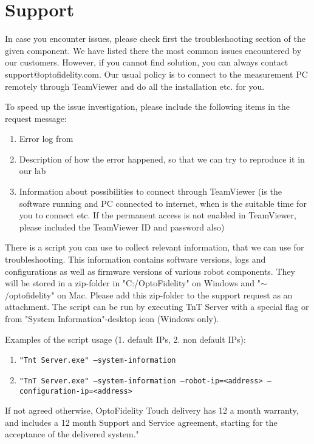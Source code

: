 \chapter{Support}
\label{part:support}
In case you encounter issues, please check first the troubleshooting section of the given component. We have listed there the most common issues encountered by our customers. However, if you cannot find solution, you can always contact support@optofidelity.com. Our usual policy is to connect to the measurement PC remotely through TeamViewer and do all the installation etc. for you.

To speed up the issue investigation, please include the following items in the request message:
\begin{enumerate}
	\item Error log from \tntLogPath
	\item Description of how the error happened, so that we can try to reproduce it in our lab
	\item Information about possibilities to connect through TeamViewer (is the software running and PC connected to internet, when is the suitable time for you to connect etc. If the permanent access is not enabled in TeamViewer, please included the TeamViewer ID and password also)
\end{enumerate}

There is a script you can use to collect relevant information, that we can use for troubleshooting. This information contains software versions, logs and configurations as well as firmware versions of various robot components. They will be stored in a zip-folder in "C:/OptoFidelity" on Windows and "$\sim$/optofidelity" on Mac. Please add this zip-folder to the support request as an attachment. The script can be run by executing TnT Server with a special flag or from "System Information"-desktop icon (Windows only).

Examples of the script usage (1. default IPs, 2. non default IPs):
\begin{enumerate}
	\item \texttt{"Tnt Server.exe" --system-information}
	\item \texttt{"TnT Server.exe" --system-information --robot-ip=<address> \newline--configuration-ip=<address>}
\end{enumerate}

If not agreed otherwise, OptoFidelity Touch delivery has 12 a month warranty, and includes a 12 month Support and Service agreement, starting for the acceptance of the delivered system."